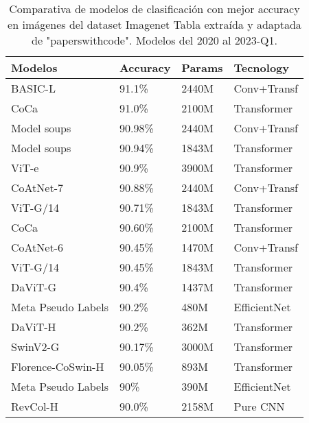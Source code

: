 \documentclass[10pt,a4paper,twocolumn,twoside]{article}
\begin{document}
\begin{table}[h]
  \centering
  \begin{tabular}{llll}
    \toprule
    \textbf{Modelos}     & \textbf{Accuracy} & \textbf{Params} & \textbf{Tecnology} \\ 
    \midrule
    BASIC-L            & 91.1\%            & 2440M           & Conv+Transf	    \\
    CoCa               & 91.0\%            & 2100M           & Transformer        \\
    Model soups        & 90.98\%           & 2440M           & Conv+Transf	    \\
    Model soups        & 90.94\%           & 1843M           & Transformer        \\
    ViT-e              & 90.9\%            & 3900M           & Transformer        \\
    CoAtNet-7          & 90.88\%           & 2440M           & Conv+Transf	    \\
    ViT-G/14           & 90.71\%           & 1843M           & Transformer        \\
    CoCa               & 90.60\%           & 2100M           & Transformer        \\
    CoAtNet-6          & 90.45\%           & 1470M           & Conv+Transf	    \\
    ViT-G/14           & 90.45\%           & 1843M           & Transformer        \\
    DaViT-G            & 90.4\%            & 1437M           & Transformer        \\
    Meta Pseudo Labels & 90.2\%            & 480M            & EfficientNet       \\
    DaViT-H            & 90.2\%            & 362M            & Transformer        \\
    SwinV2-G           & 90.17\%           & 3000M           & Transformer        \\
    Florence-CoSwin-H  & 90.05\%           & 893M            & Transformer        \\
    Meta Pseudo Labels & 90\%              & 390M            & EfficientNet       \\
    RevCol-H           & 90.0\%            & 2158M           & Pure CNN           \\
    \bottomrule
  \end{tabular}
  \caption{Comparativa de modelos de clasificación con mejor accuracy en imágenes del dataset Imagenet Tabla extraída y adaptada de "paperswithcode". Modelos del 2020 al 2023-Q1.}
  \label{tab:clasificacion}
\end{table}
\end{document}
